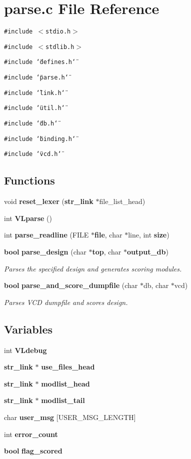 \section{parse.c File Reference}
\label{parse_8c}
{\tt \#include $<$stdio.h$>$}\par
{\tt \#include $<$stdlib.h$>$}\par
{\tt \#include \char`\"{}defines.h\char`\"{}}\par
{\tt \#include \char`\"{}parse.h\char`\"{}}\par
{\tt \#include \char`\"{}link.h\char`\"{}}\par
{\tt \#include \char`\"{}util.h\char`\"{}}\par
{\tt \#include \char`\"{}db.h\char`\"{}}\par
{\tt \#include \char`\"{}binding.h\char`\"{}}\par
{\tt \#include \char`\"{}vcd.h\char`\"{}}\par
\subsection*{Functions}
\begin{CompactItemize}
\item 
void {\bf reset\_\-lexer} ({\bf str\_\-link} $\ast$file\_\-list\_\-head)
\item 
int {\bf VLparse} ()
\item 
int {\bf parse\_\-readline} (FILE $\ast${\bf file}, char $\ast$line, int {\bf size})
\item 
{\bf bool} {\bf parse\_\-design} (char $\ast${\bf top}, char $\ast${\bf output\_\-db})
\begin{CompactList}\small\item\em Parses the specified design and generates scoring modules.\item\end{CompactList}\item 
{\bf bool} {\bf parse\_\-and\_\-score\_\-dumpfile} (char $\ast$db, char $\ast$vcd)
\begin{CompactList}\small\item\em Parses VCD dumpfile and scores design.\item\end{CompactList}\end{CompactItemize}
\subsection*{Variables}
\begin{CompactItemize}
\item 
int {\bf VLdebug}
\item 
{\bf str\_\-link} $\ast$ {\bf use\_\-files\_\-head}
\item 
{\bf str\_\-link} $\ast$ {\bf modlist\_\-head}
\item 
{\bf str\_\-link} $\ast$ {\bf modlist\_\-tail}
\item 
char {\bf user\_\-msg} [USER\_\-MSG\_\-LENGTH]
\item 
int {\bf error\_\-count}
\item 
{\bf bool} {\bf flag\_\-scored}
\end{CompactItemize}


